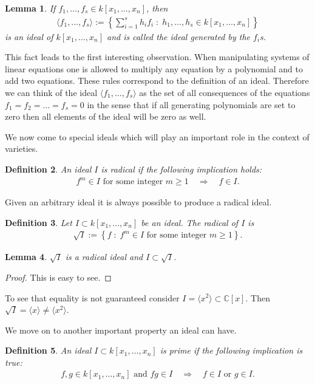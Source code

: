 \documentclass[11pt,a4paper]{scrreprt}
\newtheorem{defn}{Definition}
\newtheorem{lem}[defn]{Lemma}
\newcommand{\C}{\mathbb{C}}
\newcommand{\mvar}[2]{#1_1,\ldots , #1_{#2}}
\newcommand{\kxn}{k[\mvar{x}{n}]}
\begin{document}
\begin{lem}
If $\mvar{f}{s}\in k[\mvar{x}{n}]$, then 
\begin{align*}
\langle \mvar{f}{s} \rangle := \left\lbrace \sum_{i=1}^s h_i f_i \; : \;  \mvar{h}{s} \in \kxn \right\rbrace
\end{align*}
 is an ideal of $\kxn$ and is called the \emph{ideal generated by the $f_i$s}.
\end{lem}

This fact leads to the first interesting observation. When manipulating systems of linear equations one is allowed to multiply any equation by a polynomial and to add two equations. These rules correspond to the definition of an ideal. Therefore we can think of the ideal $\langle \mvar{f}{s} \rangle$ as the set of all consequences of the equations $f_1=f_2=\ldots =f_s=0$ in the sense that if all generating polynomials are set to zero then all elements of the ideal will be zero as well.

We now come to special ideals which will play an important role in the context of varieties.

\begin{defn}
An ideal $I$ is \emph{radical} if the following implication holds:
\begin{align*}
f^m \in I \text{ for some integer } m\geq 1 \quad \Rightarrow\quad f\in I.
\end{align*}
\end{defn}

Given an arbitrary ideal it is always possible to produce a radical ideal.
\begin{defn}
Let $I \subset \kxn$ be an ideal. The \emph{radical} of $I$  is 
\begin{align*}
\sqrt{I} := \left\lbrace  f\; :\; f^m \in I \text{ for some integer } m\geq 1  \right\rbrace .
\end{align*}
\end{defn} 

\begin{lem}
\label{lemradideals}
$\sqrt{I}$ is a radical ideal and $I\subset\sqrt{I}$.
\end{lem}
\begin{proof}
This is easy to see.
\end{proof}
To see that equality is not guaranteed consider $I= \langle x^2 \rangle \subset \C [x]$. Then $\sqrt{I} = \langle  x\rangle \neq \langle x^2 \rangle $.

We move on to another important property an ideal can have.
\begin{defn}
An ideal $I \subset \kxn $ is \emph{prime} if the following implication is true:
\begin{align*}
f, g \in \kxn \text{ and } fg\in I \quad \Rightarrow \quad f\in I \text{ or } g \in I.
\end{align*}
\end{defn}
\end{document}

